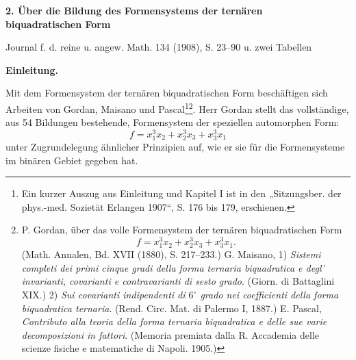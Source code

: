 \documentclass[11pt]{article}
\begin{document}
\providecommand{\Afield}{\mathfrak A}
\providecommand{\Bfield}{\mathfrak B}
\providecommand{\Cfield}{\mathfrak C}
\providecommand{\Sdomain}{\mathfrak S}
\providecommand{\Kfield}{\mathfrak K}
\providecommand{\Rfield}{\mathfrak R}
\providecommand{\Xreal}{\mathfrak X}
\providecommand{\Yreal}{\mathfrak Y}
\providecommand{\qtext}[1]{\glqq #1\grqq{}}

\begin{center}
{\Large\bfseries 2. Über die Bildung des Formensystems der ternären\\ biquadratischen Form}\par
\vspace{1.5em}
Journal f. d. reine u. angew. Math. 134 (1908), S. 23--90 u. zwei Tabellen
\end{center}

\vspace{3em}

\begin{center}
\textbf{Einleitung.}
\end{center}

Mit dem Formensystem der ternären biquadratischen Form beschäftigen sich Arbeiten von Gordan, Maisano und Pascal\footnote{Ein kurzer Auszug aus Einleitung und Kapitel I ist in den „Sitzungsber. der phys.-med. Sozietät Erlangen 1907“, S. 176 bis 179, erschienen.}\footnote{P. Gordan, über das volle Formensystem der ternären biquadratischen Form
\[
f=x_1^3x_2+x_2^3x_3+x_3^3x_1.
\]
(Math. Annalen, Bd. XVII (1880), S. 217--233.)
G. Maisano, 1) \emph{Sistemi completi dei primi cinque gradi della forma ternaria biquadratica e degl' invarianti, covarianti e contravarianti di sesto grado}. (Giorn. di Battaglini XIX.)
2) \emph{Sui covarianti indipendenti di $6^\circ$ grado nei coefficienti della forma biquadratica ternaria}. (Rend. Circ. Mat. di Palermo I, 1887.)
E. Pascal, \emph{Contributo alla teoria della forma ternaria biquadratica e delle sue varie decomposizioni in fattori}. (Memoria premiata dalla R. Accademia delle scienze fisiche e matematiche di Napoli. 1905.)}. Herr Gordan stellt das vollständige, aus 54 Bildungen bestehende, Formensystem der speziellen automorphen Form:
\[
f=x_1^3x_2+x_2^3x_3+x_3^3x_1
\]
unter Zugrundelegung ähnlicher Prinzipien auf, wie er sie für die Formensysteme im binären Gebiet gegeben hat.
\end{document}
